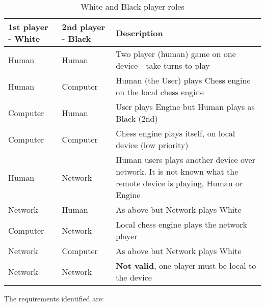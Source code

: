 \documentclass[a4paper,10pt]{article}
\begin{document}
\begin{table}[H]
\caption{White and Black player roles}
\begin{tabular}{|| p{2cm} | p{2cm} | p{11cm} ||}\hline

\textbf{1st player - White} &\textbf{2nd player - Black} & Description\\
\hline
Human & Human & Two player (human) game on one device - take turns to play \\
Human & Computer & Human (the User) plays Chess engine on the local chess engine\\
Computer & Human & User plays Engine but Human plays as Black (2nd)\\
Computer & Computer & Chess engine plays itself, on local device (low priority)\\
Human& Network & Human users plays another device over network. It is not known what the remote device is playing, Human or Engine\\
Network & Human & As above but Network plays White\\
Computer & Network & Local chess engine plays the network player\\
Network & Computer & As above but Network plays White\\
Network & Network & \textbf{Not valid}, one player must be local to the device \\
\hline
\end{tabular}
\label{table:WBRoles}
\end{table}



The requirements identified are:
\end{document}
